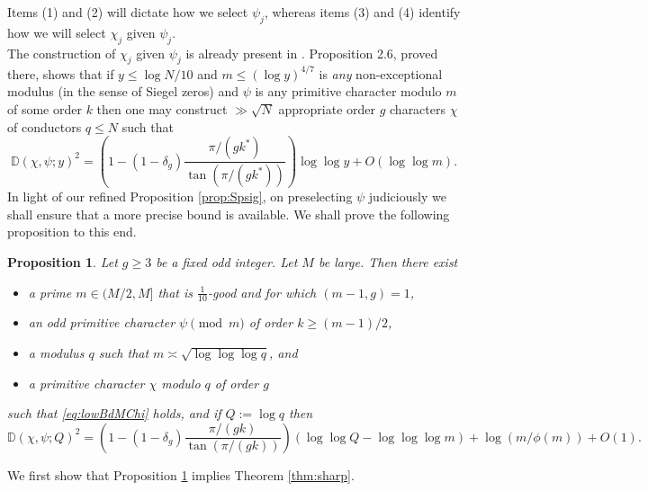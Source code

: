 \documentclass[10pt]{amsart}
\newtheorem{prop}[thm]{Proposition}
\theoremstyle{definition}
\newcommand{\mb}{\mathbb}
\begin{document}
Items (1) and (2) will dictate how we select $\psi_j$, whereas items (3) and (4) identify how we will select $\chi_j$ given $\psi_j$. \\
The construction of $\chi_j$ given $\psi_j$ is already present in \cite[Sec. 4]{LamMan}. Proposition 2.6, proved there, shows that if $y \leq \log N/10$ and $m \leq (\log y)^{4/7}$ is \emph{any} non-exceptional modulus (in the sense of Siegel zeros) and $\psi$ is any primitive character modulo $m$ of some order $k$ then one may construct $\gg \sqrt{N}$ appropriate order $g$ characters $\chi$ of conductors $q \leq N$ such that 
$$
\mb{D}(\chi,\psi;y)^2 = \left(1-(1-\delta_g)\frac{\pi/(gk^\ast)}{\tan(\pi/(gk^\ast))}\right) \log\log y + O(\log\log m).
$$
In light of our refined Proposition \ref{prop:Spsig}, on preselecting $\psi$ judiciously we shall ensure that a more precise bound is available. We shall prove the following proposition to this end.
\begin{prop}\label{prop:consChiPsi}
Let $g \geq 3$ be a fixed odd integer. Let $M$ be large. Then there exist
\begin{itemize}
\item a prime $m \in (M/2,M]$ that is $\tfrac{1}{10}$-good and for which $(m-1,g) = 1$,
\item an odd primitive character $\psi \pmod{m}$ of order $k \geq (m-1)/2$,
\item a modulus $q$ such that $m \asymp \sqrt{\log\log \log q}$, and 
\item a primitive character $\chi$ modulo $q$ of order $g$
\end{itemize}
such that \eqref{eq:lowBdMChi} holds, and if $Q := \log q$ then
$$
\mb{D}(\chi,\psi; Q)^2 = \left(1-(1-\delta_g) \frac{\pi/(gk)}{\tan(\pi/(gk))}\right) (\log\log Q - \log\log \log m) + \log(m/\phi(m)) + O(1).  
$$
\end{prop}
We first show that Proposition \ref{prop:consChiPsi} implies Theorem \ref{thm:sharp}.
\end{document}
